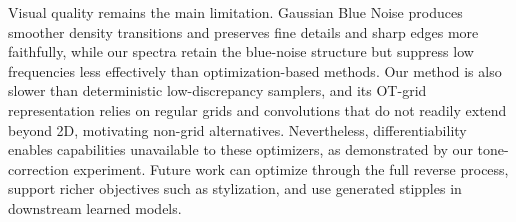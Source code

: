 \documentclass{egpubl}
\begin{document}
Visual quality remains the main limitation. Gaussian Blue Noise produces smoother density transitions and preserves fine details and sharp edges more faithfully, while our spectra retain the blue-noise structure but suppress low frequencies less effectively than optimization-based methods.
%
Our method is also slower than deterministic low-discrepancy samplers, and its OT-grid representation relies on regular grids and convolutions that do not readily extend beyond 2D, motivating non-grid alternatives.
%
Nevertheless, differentiability enables capabilities unavailable to these optimizers, as demonstrated by our tone-correction experiment. Future work can optimize through the full reverse process, support richer objectives such as stylization, and use generated stipples in downstream learned models.






\end{document}

